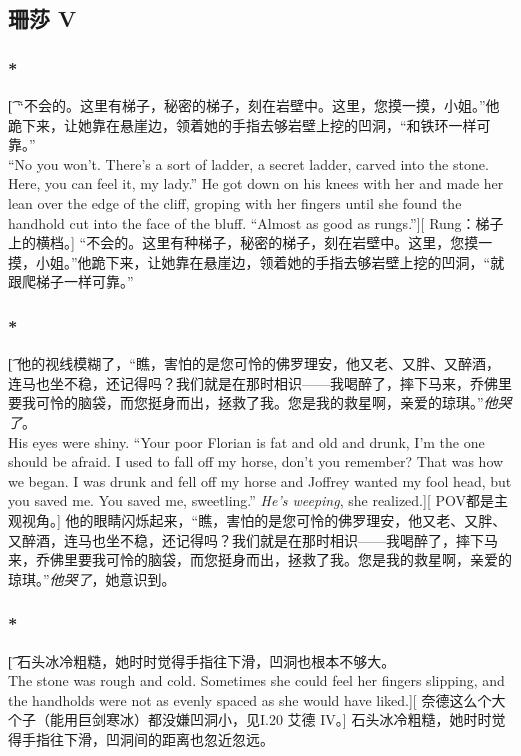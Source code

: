 \documentclass[12pt,a4paper]{article}
\begin{document}
\subsection{珊莎 V}
\subsubsection{\color{red}*}\label{3.61.1}\t[
	“不会的。这里有梯子，秘密的梯子，刻在岩壁中。这里，您摸一摸，小姐。”他跪下来，让她靠在悬崖边，领着她的手指去够岩壁上挖的凹洞，“和铁环一样可靠。”\\
	“No you won't. There's a sort of ladder, a secret ladder, carved into the stone. Here, you can feel it, my lady.” He got down on his knees with her and made her lean over the edge of the cliff, groping with her fingers until she found the handhold cut into the face of the bluff. “Almost as good as rungs.”][
	Rung：梯子上的横档。]
	“不会的。这里有种梯子，秘密的梯子，刻在岩壁中。这里，您摸一摸，小姐。”他跪下来，让她靠在悬崖边，领着她的手指去够岩壁上挖的凹洞，“就跟爬梯子一样可靠。”
	
\subsubsection{\color{red}*}\t[
	他的视线模糊了，“瞧，害怕的是您可怜的佛罗理安，他又老、又胖、又醉酒，连马也坐不稳，还记得吗？我们就是在那时相识——我喝醉了，摔下马来，乔佛里要我可怜的脑袋，而您挺身而出，拯救了我。您是我的救星啊，亲爱的琼琪。”\emph{他哭了}。\\
	His eyes were shiny. “Your poor Florian is fat and old and drunk, I'm the one should be afraid. I used to fall off my horse, don't you remember? That was how we began. I was drunk and fell off my horse and Joffrey wanted my fool head, but you saved me. You saved me, sweetling.” \emph{He's weeping}, she realized.][
	POV都是主观视角。]
	他的眼睛闪烁起来，“瞧，害怕的是您可怜的佛罗理安，他又老、又胖、又醉酒，连马也坐不稳，还记得吗？我们就是在那时相识——我喝醉了，摔下马来，乔佛里要我可怜的脑袋，而您挺身而出，拯救了我。您是我的救星啊，亲爱的琼琪。”\emph{他哭了}，她意识到。
	
\subsubsection{\color{red}*}\t[
	石头冰冷粗糙，她时时觉得手指往下滑，凹洞也根本不够大。\\
	The stone was rough and cold. Sometimes she could feel her fingers slipping, and the handholds were not as evenly spaced as she would have liked.][
	奈德这么个大个子（能用巨剑寒冰）都没嫌凹洞小，见I.20 艾德 IV。]
	石头冰冷粗糙，她时时觉得手指往下滑，凹洞间的距离也忽近忽远。
	
\end{document}
